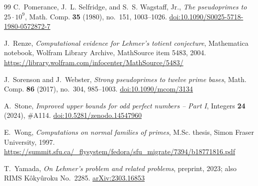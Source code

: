 \documentclass[11pt,reqno]{amsart}
\numberwithin{equation}{section}
\theoremstyle{plain}
\theoremstyle{definition}
\theoremstyle{remark}
\begin{document}
\begin{thebibliography}{99}
C.~Pomerance, J.~L. Selfridge, and S.~S. Wagstaff, Jr.,
\emph{The pseudoprimes to $25\cdot10^9$},
Math. Comp. \textbf{35} (1980), no.~151, 1003--1026.
\href{https://doi.org/10.1090/S0025-5718-1980-0572872-7}{doi:10.1090/S0025-5718-1980-0572872-7}

J.~Renze,
\emph{Computational evidence for Lehmer's totient conjecture},
Mathematica notebook, Wolfram Library Archive, MathSource item 5483, 2004.
\url{https://library.wolfram.com/infocenter/MathSource/5483/}

J.~Sorenson and J.~Webster,
\emph{Strong pseudoprimes to twelve prime bases},
Math. Comp. \textbf{86} (2017), no.~304, 985--1003.
\href{https://doi.org/10.1090/mcom/3134}{doi:10.1090/mcom/3134}

A.~Stone,
\emph{Improved upper bounds for odd perfect numbers -- Part I},
Integers \textbf{24} (2024), \#A114.
\href{https://doi.org/10.5281/zenodo.14547960}{doi:10.5281/zenodo.14547960}

E.~Wong,
\emph{Computations on normal families of primes},
M.Sc. thesis, Simon Fraser University, 1997.
\url{https://summit.sfu.ca/_flysystem/fedora/sfu_migrate/7394/b18771816.pdf}

T.~Yamada,
\emph{On Lehmer's problem and related problems},
preprint, 2023; also RIMS K\^oky\^uroku No.~2285.
\href{https://arxiv.org/abs/2303.16853}{arXiv:2303.16853}

\end{thebibliography}
\end{document}
